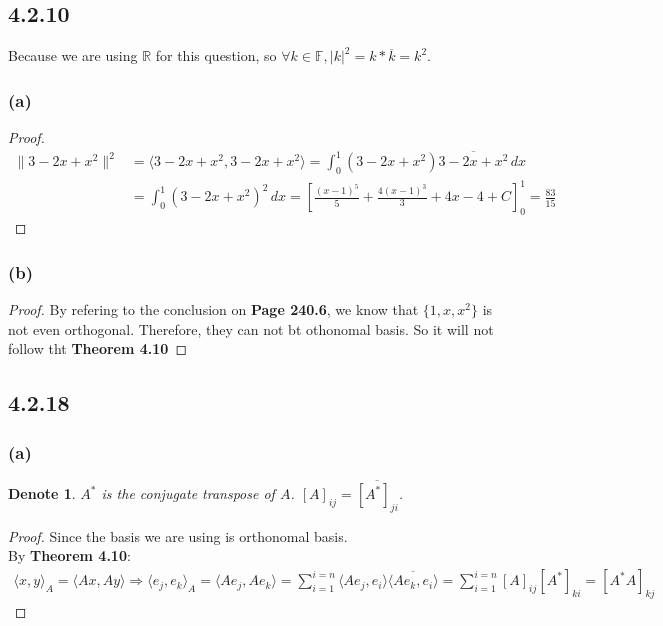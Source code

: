 \documentclass{article}
\newtheorem*{denote}{Denote}
\newtheorem*{proof}{Proof}
\begin{document}
\subsection*{4.2.10}
Because we are using $\mathbb{R}$ for this question, so $\forall k \in \mathbb{F}, |k|^2 = k * \overline k = k^2$.
\subsubsection*{(a)}
\begin{proof}
    \begin{equation*}
        \begin{split}
            \|3 - 2x + x^2 \|^2 & = \langle 3 - 2x + x^2, 3 - 2x + x^2 \rangle = \int_{0}^{1} (3 - 2x + x^2) \overline {3 - 2x + x^2} \,dx \\
                                & = \int_{0}^{1} (3 - 2x + x^2)^2 \,dx = [\frac{(x - 1)^5}{5} + \frac{4(x - 1)^3}{3} + 4x - 4 + C ]^1_0 = \frac{83}{15}
        \end{split}
    \end{equation*} 
\end{proof}

\subsubsection*{(b)}
\begin{proof}
    By refering to the conclusion on \textbf{Page 240.6}, we know that $\{1, x, x^2\}$ is not even orthogonal. Therefore, they can not bt othonomal basis. So it will not follow tht \textbf{Theorem 4.10}
\end{proof}

\subsection*{4.2.18}
\subsubsection*{(a)}
\begin{denote}
    $A^*$ is the conjugate transpose of $A$. $[A]_{ij}= \overline {[A^*]_{ji}}$.
\end{denote}
\begin{proof}
    Since the basis we are using is orthonomal basis.  \\ By \textbf{Theorem 4.10}:
\begin{equation*}
    \begin{split}
        \langle x, y\rangle_A = \langle Ax, Ay\rangle \Rightarrow \langle e_j, e_k\rangle_A = \langle Ae_j, Ae_k\rangle = \sum_{i=1}^{i=n} 
    \langle Ae_j, e_i \rangle \overline {\langle Ae_k, e_i \rangle} = \sum_{i=1}^{i=n} [A]_{ij}[A^*]_{ki} = [A^*A]_{kj}
    \end{split}
\end{equation*}
\end{proof}
\end{document}
